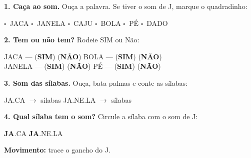 \begin{somletra}
\textbf{1. Ca\c{c}a ao som.} Ou\c{c}a a palavra. Se tiver o som de J, marque o quadradinho:
\begin{center}
$\square$~JACA \quad $\square$~JANELA \quad $\square$~CAJU \quad $\square$~BOLA \quad $\square$~P\'E \quad $\square$~DADO
\end{center}

\textbf{2. Tem ou n\~ao{} tem?} Rodeie SIM ou N\~ao:
\begin{center}
JACA --- (\textbf{SIM}) (\textbf{N\~AO}) \quad BOLA --- (\textbf{SIM}) (\textbf{N\~AO}) \\ JANELA --- (\textbf{SIM}) (\textbf{N\~AO}) \quad P\'E --- (\textbf{SIM}) (\textbf{N\~AO})
\end{center}
\end{somletra}

\begin{somsilaba}
\textbf{3. Som das s\'ilabas.} Ou\c{c}a, bata palmas e conte as s\'ilabas:
\begin{center}
JA.CA $\rightarrow$ \underline{\hspace{1cm}} s\'ilabas \quad JA.NE.LA $\rightarrow$ \underline{\hspace{1cm}} s\'ilabas
\end{center}

\textbf{4. Qual s\'ilaba tem o som?} Circule a s\'ilaba com o som de J:
\begin{center}
\textbf{JA}.CA \quad \textbf{JA}.NE.LA
\end{center}
\end{somsilaba}



\begin{motricidade}
\textbf{Movimento:} trace o gancho do J.
\begin{center}
\end{center}
\end{motricidade}

